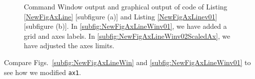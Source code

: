 \begin{figure}[htbp] %
   \centering
   \caption{Command Window output and graphical output of code of Listing \ref{NewFigAxLine} [subfigure (a)] and Listing \ref{NewFigAxLinev01} [subfigure (b)]. In \ref{subfig:NewFigAxLineWinv01}, we have added a grid and axes labels. In \ref{subfig:NewFigAxLineWinv02ScaledAx}, we have adjusted the axes limits.}
   \label{fig:NewFigAxLine}
\end{figure}
Compare Figs.\ \ref{subfig:NewFigAxLineWin} and \ref{subfig:NewFigAxLineWinv01} to see how we modified \texttt{ax1}.

